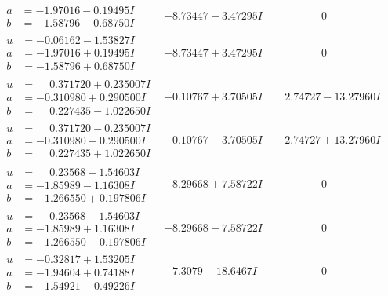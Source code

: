 \documentclass[1p]{elsarticle_modified}
\theoremstyle{definition}
\begin{document}
$$\begin{array}{c|c|c}
\begin{aligned}
a &= -1.97016 - 0.19495 I \\
b &= -1.58796 - 0.68750 I\end{aligned}
 & -8.73447 - 3.47295 I & \phantom{-0.000000 } 0 \\ \hline\begin{aligned}
u &= -0.06162 - 1.53827 I \\
a &= -1.97016 + 0.19495 I \\
b &= -1.58796 + 0.68750 I\end{aligned}
 & -8.73447 + 3.47295 I & \phantom{-0.000000 } 0 \\ \hline\begin{aligned}
u &= \phantom{-}0.371720 + 0.235007 I \\
a &= -0.310980 + 0.290500 I \\
b &= \phantom{-}0.227435 - 1.022650 I\end{aligned}
 & -0.10767 + 3.70505 I & \phantom{-}2.74727 - 13.27960 I \\ \hline\begin{aligned}
u &= \phantom{-}0.371720 - 0.235007 I \\
a &= -0.310980 - 0.290500 I \\
b &= \phantom{-}0.227435 + 1.022650 I\end{aligned}
 & -0.10767 - 3.70505 I & \phantom{-}2.74727 + 13.27960 I \\ \hline\begin{aligned}
u &= \phantom{-}0.23568 + 1.54603 I \\
a &= -1.85989 - 1.16308 I \\
b &= -1.266550 + 0.197806 I\end{aligned}
 & -8.29668 + 7.58722 I & \phantom{-0.000000 } 0 \\ \hline\begin{aligned}
u &= \phantom{-}0.23568 - 1.54603 I \\
a &= -1.85989 + 1.16308 I \\
b &= -1.266550 - 0.197806 I\end{aligned}
 & -8.29668 - 7.58722 I & \phantom{-0.000000 } 0 \\ \hline\begin{aligned}
u &= -0.32817 + 1.53205 I \\
a &= -1.94604 + 0.74188 I \\
b &= -1.54921 - 0.49226 I\end{aligned}
 & -7.3079 - 18.6467 I & \phantom{-0.000000 } 0 \\ \hline\begin{aligned}

\end{aligned}
\end{array}$$
\end{document}
